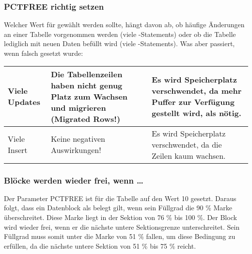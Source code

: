         \subsubsection{PCTFREE richtig setzen}
          Welcher Wert für  gewählt werden sollte, hängt davon ab, ob häufige Änderungen an einer Tabelle vorgenommen werden (viele -Statements) oder ob die Tabelle lediglich mit neuen Daten befüllt wird (viele -Statements). Was aber passiert, wenn  falsch gesetzt wurde:
          \begin{center}
            \begin{small}
              \tabletail{
                \hline
              }
              \begin{supertabular}[h]{|l|p{5cm}|p{5cm}|}
                Viele Updates & Die Tabellenzeilen haben nicht genug Platz zum Wachsen und migrieren (Migrated Rows!) & Es wird Speicherplatz verschwendet, da mehr Puffer zur Verfügung gestellt wird, als nötig. \\
                \hline
                Viele Insert & Keine negativen Auswirkungen! & Es wird Speicherplatz verschwendet, da die Zeilen kaum wachsen. \\
              \end{supertabular}
            \end{small}
          \end{center}
        \subsubsection{Blöcke werden wieder frei, wenn \dots}
          Der Parameter PCTFREE ist für die Tabelle  auf den Wert 10 gesetzt. Daraus folgt, dass ein Datenblock als belegt gilt, wenn sein Füllgrad die 90 \% Marke überschreitet. Diese Marke liegt in der Sektion von 76 \% bis 100 \%. Der Block wird wieder frei, wenn er die nächste untere Sektionsgrenze unterschreitet. Sein Füllgrad muss somit unter die Marke von 51 \% fallen, um diese Bedingung zu erfüllen, da die nächste untere Sektion von 51 \% bis 75 \% reicht.

